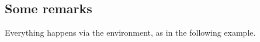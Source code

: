 \documentclass[10pt, a4paper]{article}
\begin{document}
\subsection{Some remarks}

Everything happens via the  environment, as in the following example.

\end{document}
